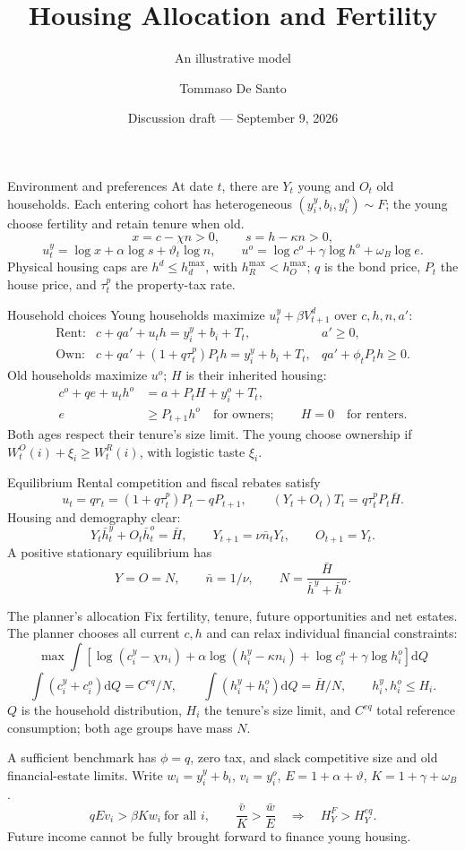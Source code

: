 \documentclass[11pt,aspectratio=169]{beamer}
\title{Housing Allocation and Fertility}
\subtitle{An illustrative model}
\author{Tommaso De Santo}
\date{Discussion draft --- September 9, 2026}
\newcommand{\dd}{\mathrm d}
\begin{document}
\begin{frame}{Environment and preferences}
At date $t$, there are $Y_t$ young and $O_t$ old households. Each entering
cohort has heterogeneous $(y_i^y,b_i,y_i^o)\sim F$; the young choose fertility and
retain tenure when old.
\[
x=c-\chi n>0,\qquad s=h-\kappa n>0,
\]
\[
u_t^y=\log x+\alpha\log s+\vartheta_t\log n,\qquad
u^o=\log c^o+\gamma\log h^o+\omega_B\log e.
\]
Physical housing caps are $h^d\le h_d^{\max}$, with $h_R^{\max}<h_O^{\max}$; $q$ is the bond
price, $P_t$ the house price, and $\tau_t^p$ the property-tax rate.
\end{frame}

\begin{frame}{Household choices}
Young households maximize $u_t^y+\beta V_{t+1}^d$ over $c,h,n,a'$:
\[
\begin{array}{rll}
\text{Rent:}&c+qa'+u_th=y_i^y+b_i+T_t,&a'\ge0,\\[0.6em]
\text{Own:}&c+qa'+(1+q\tau_t^p)P_th=y_i^y+b_i+T_t,
 &qa'+\phi_tP_th\ge0.
\end{array}
\]
Old households maximize $u^o$; $H$ is their inherited housing:
\[
\begin{aligned}
c^o+qe+u_th^o&=a+P_tH+y_i^o+T_t,\\
e&\ge P_{t+1}h^o\quad\text{for owners};\qquad H=0\quad\text{for renters}.
\end{aligned}
\]
Both ages respect their tenure's size limit. The young choose ownership if
$W_t^O(i)+\xi_i\ge W_t^R(i)$, with logistic taste $\xi_i$.
\end{frame}

\begin{frame}{Equilibrium}
Rental competition and fiscal rebates satisfy
\[
u_t=qr_t=(1+q\tau_t^p)P_t-qP_{t+1},\qquad
(Y_t+O_t)T_t=q\tau_t^pP_t\bar H.
\]
Housing and demography clear:
\[
Y_t\bar h_t^y+O_t\bar h_t^o=\bar H,\qquad
Y_{t+1}=\nu\bar n_tY_t,\qquad O_{t+1}=Y_t.
\]
A positive stationary equilibrium has
\[
Y=O=N,\qquad \bar n=1/\nu,\qquad
N=\frac{\bar H}{\bar h^y+\bar h^o}.
\]
\end{frame}

\begin{frame}{The planner's allocation}
Fix fertility, tenure, future opportunities and net estates. The planner
chooses all current $c,h$ and can relax individual financial constraints:
\[
\max\int\!\left[\log(c_i^y-\chi n_i)+\alpha\log(h_i^y-\kappa n_i)
+\log c_i^o+\gamma\log h_i^o\right]\dd Q
\]
\[
\int(c_i^y+c_i^o)\dd Q=C^{eq}/N,\qquad
\int(h_i^y+h_i^o)\dd Q=\bar H/N,\qquad h_i^y,h_i^o\le H_i.
\]
\footnotesize
$Q$ is the household distribution, $H_i$ the tenure's size limit, and
$C^{eq}$ total reference consumption; both age groups have mass $N$.

A sufficient benchmark has $\phi=q$, zero tax, and slack competitive size
and old financial-estate limits. Write $w_i=y_i^y+b_i$, $v_i=y_i^o$,
$E=1+\alpha+\vartheta$, $K=1+\gamma+\omega_B$.
\[
qEv_i>\beta Kw_i\ \text{for all }i,\qquad
\frac{\bar v}{K}>\frac{\bar w}{E}
\quad\Longrightarrow\quad H_Y^F>H_Y^{eq}.
\]
Future income cannot be fully brought forward to finance young housing.
\end{frame}
\end{document}
